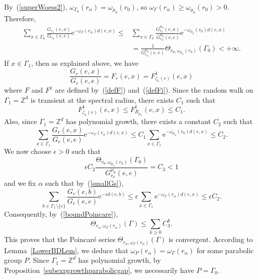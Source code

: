 \documentclass{amsart}
\theoremstyle{definition}
\theoremstyle{remark}
\begin{document}
By~(\ref{superWoess2}), $\omega_{\Gamma_0}(r_\alpha)=\omega_{\mu_0}(r_0)$, so $\omega_\Gamma(r_\alpha)\geq \omega_{\mu_0}(r_0)>0$.
Therefore,
\begin{align*}
\sum_{x\in \Gamma_0}\frac{G_{r_\alpha}(e,x)}{G_{r_\alpha}(e,e)}\mathrm{e}^{-\omega_\Gamma(r_\alpha)d(e,x)}\leq &\sum_{x\in \Gamma_0}\frac{G_{r_0}^{\mu_0}(e,x)}{G_{r_0}^{\mu_0}(e,e)}\mathrm{e}^{-\omega_{\mu_0}(r_0)d(e,x)}\\
&=\frac{1}{G_{r_0}^{\mu_0}(e,e)}\Theta_{r_0,\omega_{\mu_0}(r_0)}(\Gamma_0)<+\infty.
\end{align*}
If $x\in \Gamma_1$, then as explained above, we have
$$\frac{G_r(e,x)}{G_r(e,e)}=F_r(e,x)=F_{\zeta_1(r)}^1(e,x)$$ where $F$ and $F^1$ are defined by~(\ref{defF}) and~(\ref{defFi}).
Since the random walk on $\Gamma_1=\mathbb Z^d$ is transient at the spectral radius, there exists $C_1$ such that
$$F_{\zeta_1(r)}^1(e,x)\leq F_{R_{\mu_1}}^1(e,x)\leq C_1.$$
Also, since $\Gamma_1=\mathbb{Z}^d$ has polynomial growth, there exists a constant $C_2$ such that
$$\sum_{x\in \Gamma_1}\frac{G_r(e,x)}{G_r(e,e)}\mathrm{e}^{-\omega_{\Gamma}(r_\alpha)d(e,x)}\leq C_1 \sum_{x\in \Gamma_1}\mathrm{e}^{-\omega_{\mu_0}(r_0)d(e,x)}\leq C_2.$$
We now choose $\epsilon>0$ such that
$$\epsilon C_2 \frac{\Theta_{r_0,\omega_{\mu_0}(r_0)}(\Gamma_0)}{G_{r_0}^{\mu_0}(e,e)}=C_3<1$$
and we fix $\alpha$ such that
by~(\ref{smallGs}),
$$\sum_{b\in \Gamma_1\setminus\{e\}}\frac{G_r(e,b)}{G_r(e,e)}\mathrm{e}^{-sd(e,b)}\leq \epsilon \sum_{x\in \Gamma_1}\mathrm{e}^{-\omega_{\Gamma}(r_\alpha)d(e,x)}\leq \epsilon C_2.$$
Consequently, by~(\ref{boundPoincare}),
$$\Theta_{r_\alpha,\omega_\Gamma(r_\alpha)}(\Gamma)\leq \sum_{k\geq 0}C_3^k.$$
This proves that the Poincaré series $\Theta_{r_\alpha,\omega_\Gamma(r_\alpha)}(\Gamma)$ is convergent.
According to Lemma~\ref{LowerBDLem}, we deduce that $\omega_{P}(r_\alpha)=\omega_\Gamma(r_\alpha)$ for some parabolic group $P$.
Since $\Gamma_1=\mathbb Z^d$ has polynomial growth, by Proposition~\ref{subexpgrowthparabolicgap}, we necessarily have $P=\Gamma_0$.
\end{document}

